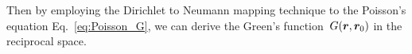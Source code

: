 

Then by employing the Dirichlet to Neumann mapping technique to the Poisson's equation Eq.~\eqref{eq:Poisson_G}, we can derive the Green's function~$G(\boldsymbol{r}, \boldsymbol{r}_0)$ in the reciprocal space. 

